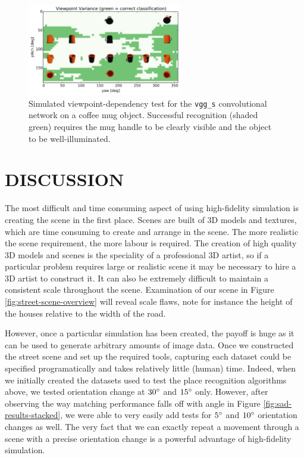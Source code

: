 \documentclass[letterpaper, 10 pt, conference]{ieeeconf}  %
\begin{document}
\begin{figure}[t]
    \centering
    \includegraphics[height=4cm]{object_recognition.pdf}
    \caption{Simulated viewpoint-dependency test for the \texttt{vgg\_s} convolutional network \cite{Chatfield14} on a coffee mug object. Successful recognition (shaded green) requires the mug handle to be clearly visible and the object to be well-illuminated.}
    \label{fig:obj-recognition}
\end{figure}


\section{DISCUSSION} \label{sec:discussion}

The most difficult and time consuming aspect of using high-fidelity simulation is creating the scene in the first place. Scenes are built of 3D models and textures, which are time consuming to create and arrange in the scene. The more realistic the scene requirement, the more labour is required. The creation of high quality 3D models and scenes is the speciality of a professional 3D artist, so if a particular problem requires large or realistic scene it may be necessary to hire a 3D artist to construct it. It can also be extremely difficult to maintain a consistent scale throughout the scene. Examination of our scene in Figure \ref{fig:street-scene-overview} will reveal scale flaws, note for instance the height of the houses relative to the width of the road.

However, once a particular simulation has been created, the payoff is huge as it can be used to generate arbitrary amounts of image data. Once we constructed the street scene and set up the required tools, capturing each dataset could be specified programatically and takes relatively little (human) time. Indeed, when we initially created the  datasets used to test the place recognition algorithms above, we tested orientation change at $30\degree$ and $15\degree$ only. However, after observing the way matching performance falls off with angle in Figure \ref{fig:sad-results-stacked}, we were able to very easily add tests for $5\degree$ and $10\degree$ orientation changes as well. The very fact that we can exactly repeat a movement through a scene with a precise orientation change is a powerful advantage of high-fidelity simulation.
\end{document}
